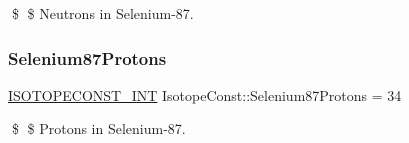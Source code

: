 \$ \$ Neutrons in Selenium-\/87. \mbox{\label{group___isotope_const-_selenium-_se87_gababb419b94bc3ac27b1ec3775664c155}} 
\subsubsection{\texorpdfstring{Selenium87\+Protons}{Selenium87Protons}}
{\footnotesize\ttfamily \mbox{\hyperlink{group___isotope_const-_macros_ga5f18360b3e99483a35c32d789e62621c}{I\+S\+O\+T\+O\+P\+E\+C\+O\+N\+S\+T\+\_\+\+I\+NT}} Isotope\+Const\+::\+Selenium87\+Protons = 34}

\$ \$ Protons in Selenium-\/87. 